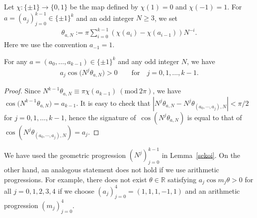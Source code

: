 Let $\chi\colon\{\pm 1\} \rightarrow \{0,1\}$ be
the map defined by $\chi(1) = 0$ and $\chi(-1) = 1$.
For $a = (a_j)_{j=0}^{k-1} \in \{\pm1\}^{k}$ and an odd integer $N\geq 3$,
we set
\begin{align*}%
\theta_{a,N} := \pi\sum_{i=0}^{k-1} (\chi(a_i) - \chi(a_{i-1}))N^{-i}.
\end{align*}
Here we use the convention $a_{-1}=1$.
\begin{Lemma}\label{sekoi}
For any $a=(a_{0},\ldots,a_{k-1})\in \{\pm1\}^{k}$ and any odd integer $N$,
we have
\begin{gather*}
a_j\cos\big(N^{j}\theta_{a,N}\big) > 0 \qquad \text{for}\quad j=0,1,\ldots,k-1.
\end{gather*}
\end{Lemma}

\begin{proof}
Since
$N^{k-1}\theta_{a,N} \equiv \pi \chi(a_{k-1}) \ (\mathrm{mod}\ 2\pi)$,
we have $\cos \big(N^{k-1} \theta_{a,N}\big) = a_{k-1}$.
It is easy to check that
$|N^{j} \theta_{a,N} - N^{j} \theta_{(a_0,\cdots,a_j),N}| < \pi/2$ for $j=0,1,\ldots,k-1$,
hence the signature of~$\cos (N^{j} \theta_{a,N})$ is equal to that of
$\cos (N^{j} \theta_{(a_0,\cdots,a_j),N}) = a_j$.
\end{proof}

\begin{Remark}
We have used the geometric progression $(N^{j})_{j=0}^{k-1}$ in Lemma~\ref{sekoi}.
On the other hand, an analogous statement does not hold if
we use arithmetic progressions. For example,
there does not exist $\theta \in \mathbb{R}$
satisfying $a_j\cos m_j\theta > 0$ for all $j=0,1,2,3,4$
if we choose $(a_j)_{j=0}^{4}=(1,1,1,-1,1)$ and
an arithmetic progression $(m_j)_{j=0}^{4}$.
\end{Remark}


